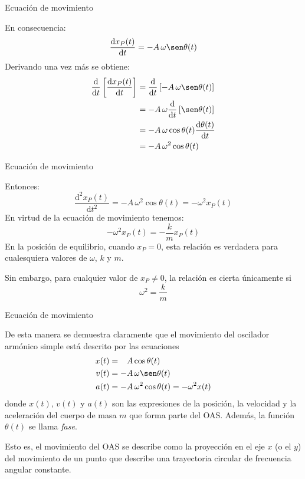 \documentclass[11pt,handout,aspectratio=1610]{beamer}
\newcommand{\fdiff}[2]{\dfrac{\text{d} #1}{\text{d} #2}}
\newcommand{\fddiff}[2]{\frac{\text{d}^2 #1}{\text{d} #2^2}}
\begin{document}
\begin{frame}{Ecuación de movimiento}

    En consecuencia: $$\fdiff{x_P (t)}{t} = - A \, \omega \sen \theta (t) $$ Derivando una vez más se obtiene:
    \begin{align*}
        \fdiff{}{t} \left[\fdiff{x_P (t)}{t}\right] &= \fdiff{}{t} \left[- A \, \omega \sen \theta (t)\right] \\
        & = - A \, \omega \fdiff{}{t} \left[\sen \theta (t)\right] \\
        & = - A \, \omega \cos \theta (t) \fdiff{\theta (t)}{t} \\
        & = - A \, \omega^2 \cos \theta (t)
    \end{align*} 
    
\end{frame}

\begin{frame}{Ecuación de movimiento}
    
    Entonces: $$\fddiff{x_P (t)}{t} = - A \, \omega^2 \cos \theta (t) = - \omega^2 x_P (t)$$ En virtud de la ecuación de movimiento tenemos: $$ - \omega^2 x_P (t) = - \frac{k}{m} x_P (t) $$ En la posición de equilibrio, cuando $x_P = 0$, esta relación es verdadera para cualesquiera valores de $\omega$, $k$ y $m$.

    \vspace{11pt}

    Sin embargo, para cualquier valor de $x_P \neq 0$, la relación es cierta únicamente si $$\omega^2 = \frac{k}{m}$$

\end{frame}

\begin{frame}{Ecuación de movimiento}

    De esta manera se demuestra claramente que el movimiento del oscilador armónico simple está descrito por las ecuaciones
    \begin{align*}
        x (t) &= \phantom{+} A \cos \theta (t) \\
        v (t) &= - A \, \omega \sen \theta (t) \\
        a (t) &= - A \, \omega^2 \cos \theta (t) = - \omega^2 x(t) 
    \end{align*} donde $x (t)$, $v (t)$ y $a (t)$ son las expresiones de la posición, la velocidad y la aceleración del cuerpo de masa $m$ que forma parte del OAS. Además, la función $\theta (t)$ se llama \emph{fase}.

    \vspace{11pt}

    Esto es, el movimiento del OAS se describe como la proyección en el eje $x$ (o el $y$) del movimiento de un punto que describe una trayectoria circular de frecuencia angular constante.

\end{frame}
\end{document}
